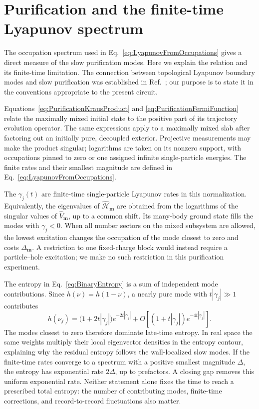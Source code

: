 \documentclass[aps,prb,10pt,twocolumn,superscriptaddress,longbibliography,floatfix]{revtex4-2}
\newcommand{\rec}{\mathbf m}   %
\begin{document}
{\color{blue}
\section{Purification and the finite-time Lyapunov spectrum}
\label{app:Lyapunov}

The occupation spectrum used in Eq.~\eqref{eq:LyapunovFromOccupations} gives a direct measure of the slow purification modes. Here we explain the relation and its finite-time limitation. The connection between topological Lyapunov boundary modes and slow purification was established in Ref.~\cite{XiaoKawabata2026}; our purpose is to state it in the conventions appropriate to the present circuit.

Equations~\eqref{eq:PurificationKrausProduct} and \eqref{eq:PurificationFermiFunction} relate the maximally mixed initial state to the positive part of its trajectory evolution operator. The same expressions apply to a maximally mixed slab after factoring out an initially pure, decoupled exterior. Projective measurements may make the product singular; logarithms are taken on its nonzero support, with occupations pinned to zero or one assigned infinite single-particle energies. The finite rates and their smallest magnitude are defined in Eq.~\eqref{eq:LyapunovFromOccupations}.

The $\gamma_j(t)$ are finite-time single-particle Lyapunov rates in this normalization. Equivalently, the eigenvalues of $\hat{\mathcal H}_{\rec}$ are obtained from the logarithms of the singular values of $\hat V_{\rec}$, up to a common shift. Its many-body ground state fills the modes with $\gamma_j<0$. When all number sectors on the mixed subsystem are allowed, the lowest excitation changes the occupation of the mode closest to zero and costs $\Delta_{\rec}$. A restriction to one fixed-charge block would instead require a particle--hole excitation; we make no such restriction in this purification experiment.

The entropy in Eq.~\eqref{eq:BinaryEntropy} is a sum of independent mode contributions. Since $h(\nu)=h(1-\nu)$, a nearly pure mode with $t|\gamma_j|\gg1$ contributes
\begin{equation}
    h(\nu_j)=
    \big(1+2t|\gamma_j|\big)e^{-2t|\gamma_j|}
    +O\!\left[(1+t|\gamma_j|)e^{-4t|\gamma_j|}\right].
    \label{eq:PurificationEntropyAsymptotic}
\end{equation}
The modes closest to zero therefore dominate late-time entropy. In real space the same weights multiply their local eigenvector densities in the entropy contour, explaining why the residual entropy follows the wall-localized slow modes. If the finite-time rates converge to a spectrum with a positive smallest magnitude $\Delta$, the entropy has exponential rate $2\Delta$, up to prefactors. A closing gap removes this uniform exponential rate. Neither statement alone fixes the time to reach a prescribed total entropy: the number of contributing modes, finite-time corrections, and record-to-record fluctuations also matter.

}
\end{document}
